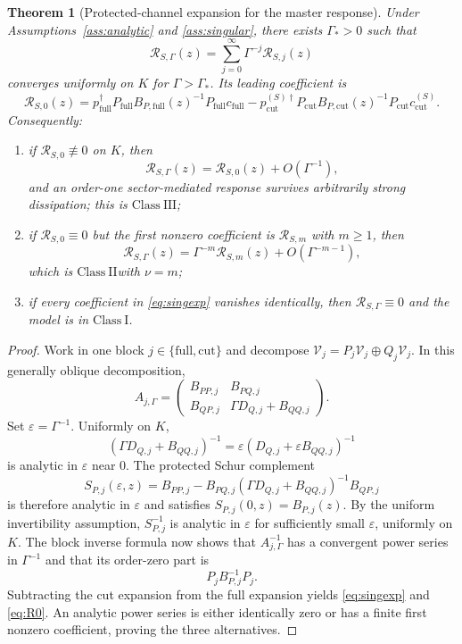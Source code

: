 \documentclass[11pt]{article}
\newtheorem{theorem}{Theorem}[section]
\theoremstyle{definition}
\theoremstyle{remark}
\theoremstyle{plain}
\newcommand{\V}{\mathcal V}
\newcommand{\R}{\mathcal R}
\newcommand{\full}{\mathrm{full}}
\newcommand{\cut}{\mathrm{cut}}
\newcommand{\ClassI}{\ensuremath{\mathrm{Class\ I}}}
\newcommand{\ClassII}{\ensuremath{\mathrm{Class\ II}}}
\newcommand{\ClassIII}{\ensuremath{\mathrm{Class\ III}}}
\begin{document}
\begin{theorem}[Protected-channel expansion for the master response]\label{thm:singular}
Under Assumptions~\ref{ass:analytic} and \ref{ass:singular}, there exists $\Gamma_*>0$ such that
\begin{equation}\label{eq:singexp}
 \R_{S,\Gamma}(z)=\sum_{j=0}^{\infty}\Gamma^{-j}\R_{S,j}(z)
\end{equation}
converges uniformly on $K$ for $\Gamma>\Gamma_*$.  Its leading coefficient is
\begin{equation}\label{eq:R0}
 \boxed{
 \R_{S,0}(z)=
 p_{\full}^\dagger P_{\full}B_{P,\full}(z)^{-1}P_{\full}c_{\full}
 -p_{\cut}^{(S)\dagger}P_{\cut}B_{P,\cut}(z)^{-1}P_{\cut}c_{\cut}^{(S)}.}
\end{equation}
Consequently:
\begin{enumerate}[label=(\roman*)]
 \item if $\R_{S,0}\not\equiv0$ on $K$, then
 \[
   \R_{S,\Gamma}(z)=\R_{S,0}(z)+O(\Gamma^{-1}),
 \]
 and an order-one sector-mediated response survives arbitrarily strong dissipation; this is \ClassIII;
 \item if $\R_{S,0}\equiv0$ but the first nonzero coefficient is $\R_{S,m}$ with $m\ge1$, then
 \[
   \R_{S,\Gamma}(z)=\Gamma^{-m}\R_{S,m}(z)+O(\Gamma^{-m-1}),
 \]
 which is \ClassII with $\nu=m$;
 \item if every coefficient in \eqref{eq:singexp} vanishes identically, then $\R_{S,\Gamma}\equiv0$ and the model is in \ClassI.
\end{enumerate}
\end{theorem}

\begin{proof}
Work in one block $j\in\{\full,\cut\}$ and decompose $\V_j=P_j\V_j\oplus Q_j\V_j$.  In this generally oblique decomposition,
\[
 A_{j,\Gamma}=
 \begin{pmatrix}
  B_{PP,j}&B_{PQ,j}\\
  B_{QP,j}&\Gamma D_{Q,j}+B_{QQ,j}
 \end{pmatrix}.
\]
Set $\varepsilon=\Gamma^{-1}$.  Uniformly on $K$,
\[
 (\Gamma D_{Q,j}+B_{QQ,j})^{-1}
 =\varepsilon(D_{Q,j}+\varepsilon B_{QQ,j})^{-1}
\]
is analytic in $\varepsilon$ near $0$.  The protected Schur complement
\[
 S_{P,j}(\varepsilon,z)
 =B_{PP,j}-B_{PQ,j}(\Gamma D_{Q,j}+B_{QQ,j})^{-1}B_{QP,j}
\]
is therefore analytic in $\varepsilon$ and satisfies
$S_{P,j}(0,z)=B_{P,j}(z)$.  By the uniform invertibility assumption, $S_{P,j}^{-1}$ is analytic in $\varepsilon$ for sufficiently small $\varepsilon$, uniformly on $K$.  The block inverse formula now shows that $A_{j,\Gamma}^{-1}$ has a convergent power series in $\Gamma^{-1}$ and that its order-zero part is
\[
 P_j B_{P,j}^{-1}P_j.
\]
Subtracting the cut expansion from the full expansion yields \eqref{eq:singexp} and \eqref{eq:R0}.  An analytic power series is either identically zero or has a finite first nonzero coefficient, proving the three alternatives.
\end{proof}
\end{document}
